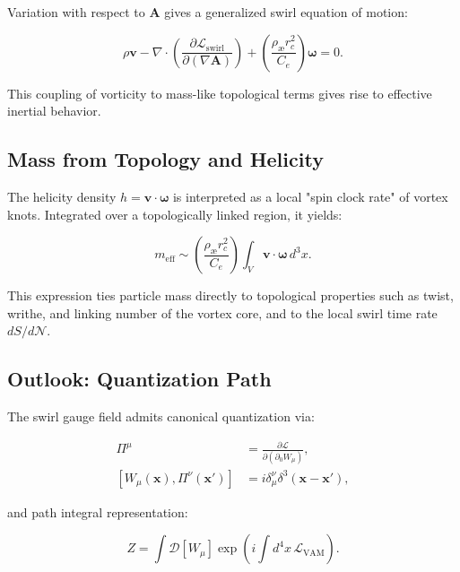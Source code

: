 \documentclass[12pt]{article}
\begin{document}
Variation with respect to $\mathbf{A}$ gives a generalized swirl equation of motion:

\begin{equation}
\rho \mathbf{v} - \nabla \cdot \left( \frac{\partial \mathcal{L}_{\text{swirl}}}{\partial (\nabla \mathbf{A})} \right) + \left( \frac{\rho_{\text{\ae}} r_c^2}{C_e} \right) \boldsymbol{\omega} = 0.
\end{equation}

This coupling of vorticity to mass-like topological terms gives rise to effective inertial behavior.

\subsection{Mass from Topology and Helicity}

The helicity density $h = \mathbf{v} \cdot \boldsymbol{\omega}$ is interpreted as a local "spin clock rate" of vortex knots. Integrated over a topologically linked region, it yields:

\begin{equation}
m_{\text{eff}} \sim \left( \frac{\rho_{\text{\ae}} r_c^2}{C_e} \right) \int_V \mathbf{v} \cdot \boldsymbol{\omega} \, d^3x.
\end{equation}

This expression ties particle mass directly to topological properties such as twist, writhe, and linking number of the vortex core, and to the local swirl time rate $dS/d\mathcal{N}$.

\subsection{Outlook: Quantization Path}

The swirl gauge field admits canonical quantization via:

\begin{align}
\Pi^\mu &= \frac{\partial \mathcal{L}}{\partial (\partial_0 W_\mu)}, \\
[W_\mu(\mathbf{x}), \Pi^\nu(\mathbf{x}')] &= i \delta^\nu_\mu \delta^3(\mathbf{x} - \mathbf{x}'),
\end{align}

and path integral representation:

\begin{equation}
Z = \int \mathcal{D}[W_\mu] \exp\left(i \int d^4x \, \mathcal{L}_{\text{VAM}}\right).
\end{equation}
\end{document}
